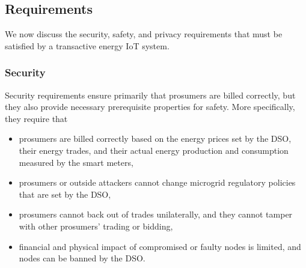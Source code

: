 \subsection{Requirements}
We now discuss the security, safety, and privacy requirements that
must be satisfied by a transactive energy IoT system.

\subsubsection{Security}
Security requirements ensure primarily that prosumers are billed
correctly, but they also provide necessary prerequisite properties for
safety.
More specifically, they require that
\begin{itemize}[noitemsep,topsep=-\parskip]
\item prosumers are billed correctly based on the energy prices set by
  the DSO, their energy trades, and their actual energy production and
  consumption measured by the smart meters,
\item prosumers or outside attackers cannot change microgrid
  regulatory policies that are set by the DSO, 
\item prosumers cannot back out of trades unilaterally, and they
  cannot tamper with other prosumers' trading or bidding,
\item financial and physical impact of compromised or faulty nodes is
  limited, and nodes can be banned by the DSO. 
\end{itemize}


